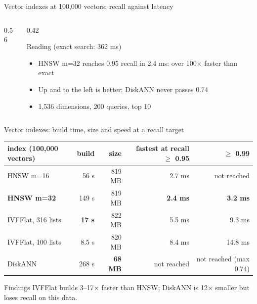 \documentclass[aspectratio=169,10pt]{beamer}
\newcommand{\pgfaxis}[1]{\begin{axis}[width=\linewidth,height=0.5\textheight,#1,grid=major,grid style={black!12},tick label style={font=\scriptsize},label style={font=\footnotesize},legend style={font=\tiny,at={(0.5,-0.28)},anchor=north,legend columns=3},cycle list={{blue!70!black,mark=*},{red!75!black,mark=square*},{green!45!black,mark=triangle*},{orange!85!black,mark=diamond*},{violet,mark=pentagon*}},every axis plot/.append style={thick,mark size=1.6pt}]}
\begin{document}
\begin{frame}[shrink=5]{Vector indexes at 100,000 vectors: recall against latency}
\begin{columns}[T]
\begin{column}{0.56\textwidth}
\end{column}
\begin{column}{0.42\textwidth}
\begin{block}{Reading (exact search: 362 ms)}
\begin{itemize}
  \item HNSW m=32 reaches 0.95 recall in 2.4 ms: over 100$\times$ faster than exact
  \item Up and to the left is better; DiskANN never passes 0.74
  \item 1,536 dimensions, 200 queries, top 10
\end{itemize}
\end{block}
\end{column}
\end{columns}
\end{frame}

\begin{frame}[shrink=5]{Vector indexes: build time, size and speed at a recall target}
\centering
\begin{tabular}{@{}lrrrr@{}}
\toprule
index (100,000 vectors) & build & size & fastest at recall $\ge$ 0.95 & $\ge$ 0.99\\
\midrule
HNSW m=16 & 56 s & 819 MB & 2.7 ms & not reached\\
\textbf{HNSW m=32} & 149 s & 819 MB & \textbf{2.4 ms} & \textbf{3.2 ms}\\
IVFFlat, 316 lists & \textbf{17 s} & 822 MB & 5.5 ms & 9.3 ms\\
IVFFlat, 100 lists & 8.5 s & 820 MB & 8.4 ms & 14.8 ms\\
DiskANN & 268 s & \textbf{68 MB} & not reached & not reached (max 0.74)\\
\bottomrule
\end{tabular}\par\vspace{0.5em}
\begin{block}{Findings}
IVFFlat builds 3--17$\times$ faster than HNSW; DiskANN is 12$\times$ smaller but loses recall on this data.
\end{block}
\end{frame}
\end{document}
